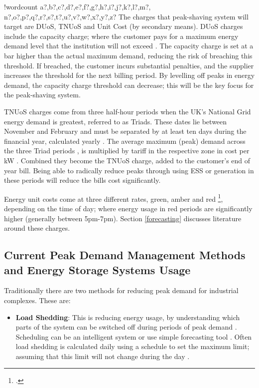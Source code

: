 \documentclass[10pt]{article}
\providecommand{\tightlist}{%
  \setlength{\itemsep}{0pt}\setlength{\parskip}{0pt}}
\newcounter{words}
\newenvironment{counted}{%
  \setcounter{words}{0}
  \SearchList!{wordcount}{\stepcounter{words}}
    {a?,b?,c?,d?,e?,f?,g?,h?,i?,j?,k?,l?,m?,
    n?,o?,p?,q?,r?,s?,t?,u?,v?,w?,x?,y?,z?}
  \UndoBoundary{'}
  \SearchOrder{p;}}{%
  \StopSearching}
\begin{document}
\begin{counted}
The charges that peak-shaving system will target are DUoS, TNUoS and
Unit Cost (by secondary means). DUoS charges include the capacity
charge; where the customer pays for a maximum energy demand level that
the institution will not exceed \cite{Deconstr52:online}. The capacity
charge is set at a bar higher than the actual maximum demand, reducing
the risk of breaching this threshold. If breached, the customer incurs
substantial penalties, and the supplier increases the threshold for the
next billing period. By levelling off peaks in energy demand, the
capacity charge threshold can decrease; this will be the key focus for
the peak-shaving system.

TNUoS charges come from three half-hour periods when the UK's National
Grid energy demand is greatest, referred to as Triads. These dates lie
between November and February and must be separated by at least ten days
during the financial year, calculated yearly \cite{TriadsWh7:online}.
The average maximum (peak) demand across the three Triad periods
\cite{TNUoSTra99:online}, is multiplied by tariff in the respective zone
in cost per kW \cite{TNUoScha93:online}. Combined they become the TNUoS
charge, added to the customer's end of year bill. Being able to
radically reduce peaks through using ESS or generation in these periods
will reduce the bills cost significantly.

Energy unit costs come at three different rates, green, amber and red
\footcite[See page 27 of][]{SWEB201492:online}, depending on the time of
day; where energy usage in red periods are significantly higher
(generally between 5pm-7pm). Section \ref{forecasting} discusses
literature around these charges.

\subsection{Current Peak Demand Management Methods and Energy Storage
Systems
Usage}\label{current-peak-demand-management-methods-and-energy-storage-systems-usage}

Traditionally there are two methods for reducing peak demand for
industrial complexes. These are:

\begin{itemize}
\tightlist
\item
  \textbf{Load Shedding}: This is reducing energy usage, by
  understanding which parts of the system can be switched off during
  periods of peak demand \cite{6199851}. Scheduling can be an
  intelligent system or use simple forecasting tool
  \cite{Reducing37:online}. Often load shedding is calculated daily
  using a schedule to set the maximum limit; assuming that this limit
  will not change during the day \cite{6938948}.


\end{itemize}
\end{counted}
\end{document}
